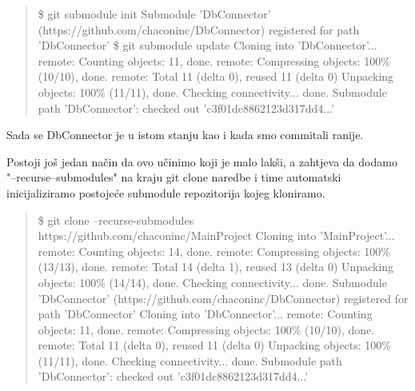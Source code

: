 \documentclass {article}
\begin{document}
\begin{enumerate}
\begin{enumerate}
    \begin{quote}
        \$ git submodule init
\newline Submodule 'DbConnector' (https://github.com/chaconinc/DbConnector) registered for path 'DbConnector'
\newline \$ git submodule update
\newline Cloning into 'DbConnector'...
\newline remote: Counting objects: 11, done.
\newline remote: Compressing objects: 100\% (10/10), done.
\newline remote: Total 11 (delta 0), reused 11 (delta 0)
\newline Unpacking objects: 100\% (11/11), done.
\newline Checking connectivity... done.
\newline Submodule path 'DbConnector': checked out 'c3f01dc8862123d317dd4...'
    \end{quote}
    
Sada se DbConnector je u istom stanju kao i kada smo commitali ranije.

\newpage
Postoji još jedan način da ovo učinimo koji je malo lakši, a zahtjeva da dodamo "--recurse--submodules" na kraju git clone naredbe i time automatski inicijaliziramo postojeće submodule repozitorija kojeg kloniramo.
\newline
    \begin{quote}
        \$ git clone --recurse-submodules https://github.com/chaconinc/MainProject
\newline Cloning into 'MainProject'...
\newline remote: Counting objects: 14, done.
\newline remote: Compressing objects: 100\% (13/13), done.
\newline remote: Total 14 (delta 1), reused 13 (delta 0)
\newline Unpacking objects: 100\% (14/14), done.
\newline Checking connectivity... done.
\newline Submodule 'DbConnector' (https://github.com/chaconinc/DbConnector) registered for path 'DbConnector'
\newline Cloning into 'DbConnector'...
\newline remote: Counting objects: 11, done.
\newline remote: Compressing objects: 100\% (10/10), done.
\newline remote: Total 11 (delta 0), reused 11 (delta 0)
\newline Unpacking objects: 100\% (11/11), done.
\newline Checking connectivity... done.
\newline Submodule path 'DbConnector': checked out 'c3f01dc8862123d317dd4...'
\newline
    \end{quote}
    

\end{enumerate}
\end{enumerate}
\end{document}
